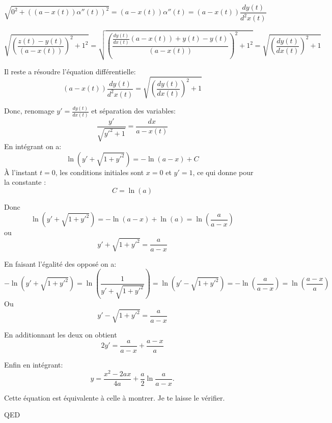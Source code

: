 \documentclass[]{book}
\theoremstyle{definition}
\begin{document}
$$
\sqrt{0^2 + ((a-x(t))\alpha''(t))^2} = (a-x(t))\alpha''(t) = (a-x(t))\frac{dy(t)}{d^2x(t)}
$$

$$
\sqrt{(\frac{z(t)-y(t)}{(a-x(t))})^2 + 1^2} = \sqrt{\left(\frac{\frac{dy(t)}{dx(t)}(a - x(t)) + y(t) -y(t)}{(a-x(t))}\right)^2 + 1^2} = \sqrt{\left(\frac{dy(t)}{dx(t)}\right)^2+1}
$$

Il reste a r\'esoudre l'\'equation diff\'erentielle:
$$
(a-x(t))\frac{dy(t)}{d^2x(t)} = \sqrt{\left(\frac{dy(t)}{dx(t)}\right)^2+1}
$$

Donc, renomage $y' = \frac{dy(t)}{dx(t)}$ et s\'eparation des variables:
$$
\frac{y'}{\sqrt{y'^2+1}} = \frac{dx}{a-x(t)}
$$
En int\'egrant on a:
$$
\ln(y'+{\sqrt  {1+y'^{2}}})=-\ln(a-x)+C
$$
\`A l'instant $t=0$, les conditions initiales sont $x=0$ et $y'=1$, ce qui donne pour la constante :
$$
C=\ln(a)
$$

Donc
$$
\ln(y'+{\sqrt  {1+y'^{2}}})=-\ln(a-x)+\ln(a) = \ln \left(\frac{a}{a-x}\right)
$$
ou
$$
y'+\sqrt  {1+y'^{2}}=\frac{a}{a-x}
$$

En faisant l'\'egalit\'e des oppos\'e on a:
$$
-\ln(y'+{\sqrt{1+y'^{2}}})= \ln\left(\frac{1}{y'+\sqrt  {1+y'^{2}}}\right) = \ln({y'-\sqrt  {1+y'^{2}}}) = - \ln \left(\frac{a}{a-x}\right) = \ln \left(\frac{a-x}{a}\right)
$$ 
Ou
$$
y'-\sqrt{1+y'^{2}}=\frac{a}{a-x}
$$

En additionnant les deux on obtient
$$
2y' = \frac{a}{a-x} + \frac{a-x}{a}
$$

Enfin en int\'egrant:
$$
y={\frac  {x^{2}-2ax}{4a}}+{\frac  {a}{2}}\ln {{\frac  {a}{a-x}}}.
$$

Cette \'equation est \'equivalente \`a celle \`a montrer.
Je te laisse le v\'erifier.

QED
\end{document}
